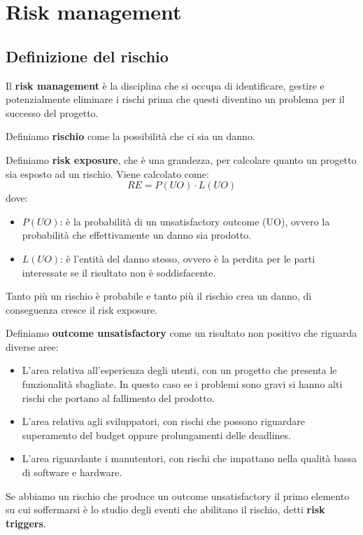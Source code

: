 \chapter{Risk management}
\section{Definizione del rischio}
\begin{definizione}
    Il \textbf{risk management} è la disciplina che si occupa di identificare,
    gestire e potenzialmente eliminare i rischi prima che questi diventino un
    problema per il successo del progetto.
\end{definizione}
\begin{definizione}
    Definiamo \textbf{rischio} come la possibilità che ci sia un danno.
\end{definizione}
\begin{definizione}
    Definiamo \textbf{risk exposure}, che è una grandezza, per calcolare quanto
    un progetto sia esposto ad un rischio. Viene calcolato come:
    \begin{equation}
        RE = P(UO) \cdot L(UO)
    \end{equation}
    dove:
    \begin{itemize}
        \item $P(UO)$: è la probabilità di un unsatisfactory outcome (UO), ovvero
              la probabilità che effettivamente un danno sia prodotto.
        \item $L(UO)$: è l'entità del danno stesso, ovvero è la perdita per le
              parti interessate se il risultato non è soddisfacente.
    \end{itemize}
    Tanto più un rischio è probabile e tanto più il rischio crea un danno, di
    conseguenza cresce il risk exposure.
\end{definizione}
\begin{definizione}
    Definiamo \textbf{outcome unsatisfactory} come un risultato non positivo che
    riguarda diverse aree:
    \begin{itemize}
        \item L'area relativa all'esperienza degli utenti, con un progetto che
              presenta le funzionalità sbagliate. In questo caso se i problemi sono
              gravi si hanno alti rischi che portano al fallimento del prodotto.
        \item L'area relativa agli sviluppatori, con rischi che possono riguardare
              superamento del budget oppure prolungamenti delle deadlines.
        \item L'area riguardante i manutentori, con rischi che impattano nella
              qualità bassa di software e hardware.
    \end{itemize}
\end{definizione}
Se abbiamo un rischio che produce un outcome unsatisfactory il primo elemento su
cui soffermarsi è lo studio degli eventi che abilitano il rischio, detti
\textbf{risk triggers}.

